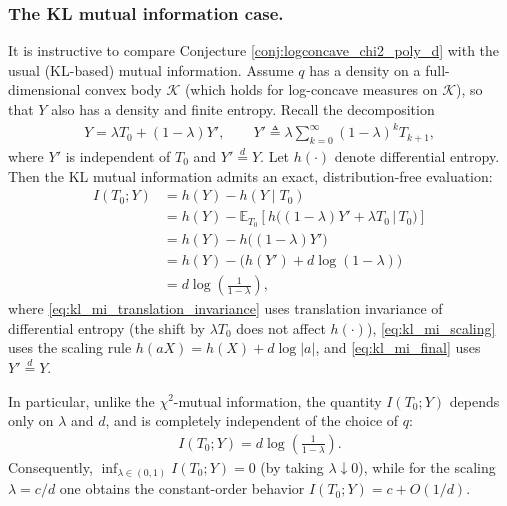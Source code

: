 \documentclass{article}
\theoremstyle{plain}
\theoremstyle{definition}
\theoremstyle{plain}
\newcommand{\E}{\mathbb E}
\newcommand{\cK}{\mathcal K}
\begin{document}
\clearpage
\subsubsection{The KL mutual information case.}
It is instructive to compare Conjecture \ref{conj:logconcave_chi2_poly_d} with the usual (KL-based) mutual information.
Assume $q$ has a density on a full-dimensional convex body $\cK$ (which holds for log-concave measures on $\cK$),
so that $Y$ also has a density and finite entropy.
Recall the decomposition
\begin{align}
    Y
    = \lambda T_0 + (1-\lambda)Y',
    \qquad
    Y' \triangleq \lambda \sum_{k=0}^\infty (1-\lambda)^k T_{k+1},
\end{align}
where $Y'$ is independent of $T_0$ and $Y' \stackrel{d}{=} Y$.
Let $h(\cdot)$ denote differential entropy.
Then the KL mutual information admits an exact, distribution-free evaluation:
\begin{align}
    I(T_0;Y)
     & = h(Y) - h(Y \mid T_0)\label{eq:kl_mi_entropy_def}                                                                     \\
     & = h(Y) - \E_{T_0}\!\left[ h\bigl( (1-\lambda)Y' + \lambda T_0 \,\big|\, T_0 \bigr) \right]\label{eq:kl_mi_expand_cond} \\
     & = h(Y) - h\bigl((1-\lambda)Y'\bigr)\label{eq:kl_mi_translation_invariance}                                             \\
     & = h(Y) - \bigl(h(Y') + d\log(1-\lambda)\bigr)\label{eq:kl_mi_scaling}                                                  \\
     & = d\log\!\left(\frac{1}{1 - \lambda}\right)\label{eq:kl_mi_final},
\end{align}
where \eqref{eq:kl_mi_translation_invariance} uses translation invariance of differential entropy
(the shift by $\lambda T_0$ does not affect $h(\cdot)$), \eqref{eq:kl_mi_scaling} uses the scaling rule
$h(aX)=h(X)+d\log|a|$, and \eqref{eq:kl_mi_final} uses $Y'\stackrel{d}{=}Y$.

In particular, unlike the $\chi^2$-mutual information, the quantity $I(T_0;Y)$ depends only on $\lambda$ and $d$,
and is completely independent of the choice of $q$:
\begin{align}
    I(T_0;Y) = d\log\!\left(\frac{1}{1-\lambda}\right).
\end{align}
Consequently, $\inf_{\lambda\in(0,1)} I(T_0;Y)=0$ (by taking $\lambda\downarrow 0$), while for the scaling
$\lambda = c/d$ one obtains the constant-order behavior $I(T_0;Y)=c+O(1/d)$.
\end{document}
